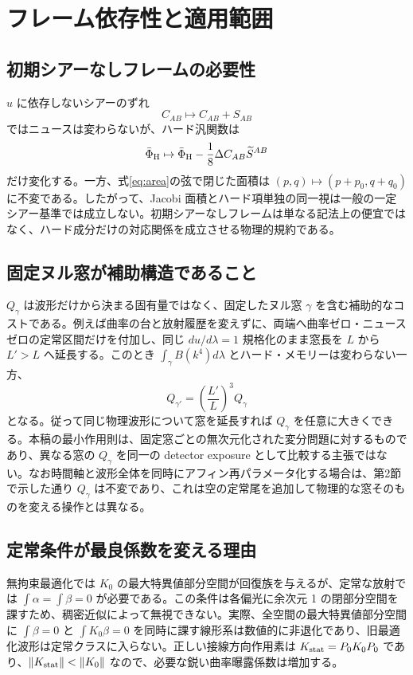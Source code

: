 \section{フレーム依存性と適用範囲}
\subsection{初期シアーなしフレームの必要性}
$u$ に依存しないシアーのずれ
\[
C_{AB}\mapsto C_{AB}+S_{AB}
\]
ではニュースは変わらないが、ハード汎関数は
\[
\bar\Phi_{\rm H}\mapsto\bar\Phi_{\rm H}
-\frac18\Delta C_{AB}\widetilde S^{AB}
\]
だけ変化する。一方、式\eqref{eq:area}の弦で閉じた面積は $(p,q)\mapsto(p+p_0,q+q_0)$ に不変である。したがって、Jacobi 面積とハード項単独の同一視は一般の一定シアー基準では成立しない。初期シアーなしフレームは単なる記法上の便宜ではなく、ハード成分だけの対応関係を成立させる物理的規約である。

\subsection{固定ヌル窓が補助構造であること}
$Q_\gamma$ は波形だけから決まる固有量ではなく、固定したヌル窓 $\gamma$ を含む補助的なコストである。例えば曲率の台と放射履歴を変えずに、両端へ曲率ゼロ・ニュースゼロの定常区間だけを付加し、同じ $du/d\lambda=1$ 規格化のまま窓長を $L$ から $L'>L$ へ延長する。このとき $\int_\gamma B(k^4)d\lambda$ とハード・メモリーは変わらない一方、
\[
Q_{\gamma'}=\left(\frac{L'}{L}\right)^3Q_\gamma
\]
となる。従って同じ物理波形について窓を延長すれば $Q_\gamma$ を任意に大きくできる。本稿の最小作用則は、固定窓ごとの無次元化された変分問題に対するものであり、異なる窓の $Q_\gamma$ を同一の detector exposure として比較する主張ではない。なお時間軸と波形全体を同時にアフィン再パラメータ化する場合は、第2節で示した通り $Q_\gamma$ は不変であり、これは空の定常尾を追加して物理的な窓そのものを変える操作とは異なる。

\subsection{定常条件が最良係数を変える理由}
無拘束最適化では $K_0$ の最大特異値部分空間が回復族を与えるが、定常な放射では $\int\alpha=\int\beta=0$ が必要である。この条件は各偏光に余次元 1 の閉部分空間を課すため、稠密近似によって無視できない。実際、全空間の最大特異値部分空間に $\int\beta=0$ と $\int K_0\beta=0$ を同時に課す線形系は数値的に非退化であり、旧最適化波形は定常クラスに入らない。正しい接線方向作用素は $K_{\rm stat}=P_0K_0P_0$ であり、$\|K_{\rm stat}\|<\|K_0\|$ なので、必要な鋭い曲率曝露係数は増加する。

